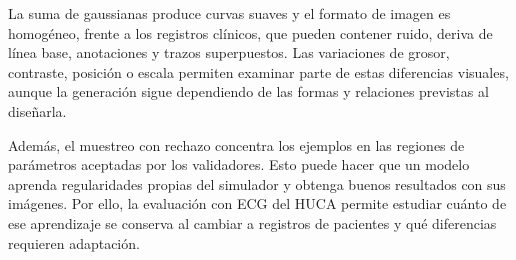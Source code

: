 La suma de gaussianas produce curvas suaves y el formato de imagen es homogéneo, frente a los registros clínicos, que pueden contener ruido, deriva de línea base, anotaciones y trazos superpuestos. Las variaciones de grosor, contraste, posición o escala permiten examinar parte de estas diferencias visuales, aunque la generación sigue dependiendo de las formas y relaciones previstas al diseñarla.

Además, el muestreo con rechazo concentra los ejemplos en las regiones de parámetros aceptadas por los validadores. Esto puede hacer que un modelo aprenda regularidades propias del simulador y obtenga buenos resultados con sus imágenes. Por ello, la evaluación con ECG del HUCA permite estudiar cuánto de ese aprendizaje se conserva al cambiar a registros de pacientes y qué diferencias requieren adaptación.
